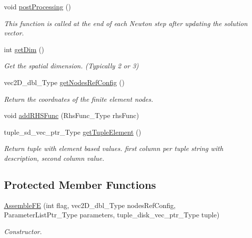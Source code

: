 \begin{DoxyCompactItemize}
void \hyperlink{classFEDD_1_1AssembleFE_a8ae32f71020082d81b055afbeda6fc29}{post\+Processing} ()
\begin{DoxyCompactList}\small\item\em This function is called at the end of each Newton step after updating the solution vector. \end{DoxyCompactList}\item 
int \hyperlink{classFEDD_1_1AssembleFE_a35ada89164c74b433340733c01f30f4b}{get\+Dim} ()
\begin{DoxyCompactList}\small\item\em Get the spatial dimension. (Typically 2 or 3) \end{DoxyCompactList}\item 
vec2\+D\+\_\+dbl\+\_\+\+Type \hyperlink{classFEDD_1_1AssembleFE_a93f37b5e5f8f9a73152abb2e8be4ba4f}{get\+Nodes\+Ref\+Config} ()
\begin{DoxyCompactList}\small\item\em Return the coordnates of the finite element nodes. \end{DoxyCompactList}\item 
void \hyperlink{classFEDD_1_1AssembleFE_a9eea5124c4b385c2807ad8b20614d050}{add\+R\+H\+S\+Func} (Rhs\+Func\+\_\+\+Type rhs\+Func)
\item 
tuple\+\_\+sd\+\_\+vec\+\_\+ptr\+\_\+\+Type \hyperlink{classFEDD_1_1AssembleFE_a4d5d128fbd72747e01af917b16cee6f6}{get\+Tuple\+Element} ()
\begin{DoxyCompactList}\small\item\em Return tuple with element based values. first column per tuple string with description, second column value. \end{DoxyCompactList}\end{DoxyCompactItemize}
\subsection*{Protected Member Functions}
\begin{DoxyCompactItemize}
\item 
\hyperlink{classFEDD_1_1AssembleFE_a5ff56b610942ec92cc1b1e0ac1e07ce4}{Assemble\+FE} (int flag, vec2\+D\+\_\+dbl\+\_\+\+Type nodes\+Ref\+Config, Parameter\+List\+Ptr\+\_\+\+Type parameters, tuple\+\_\+disk\+\_\+vec\+\_\+ptr\+\_\+\+Type tuple)
\begin{DoxyCompactList}\small\item\em Constructor. \end{DoxyCompactList}\end{DoxyCompactItemize}
